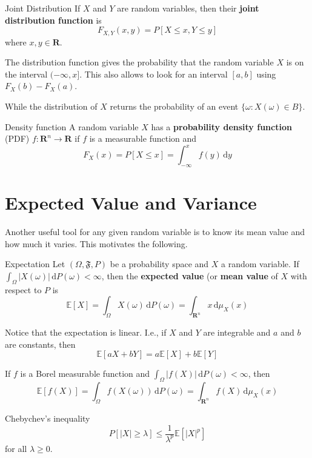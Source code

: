 \begin{definition}[]{Joint Distribution}{}
	If $X$ and $Y$ are random variables, then their \textbf{joint distribution function} is
	\[
		F_{X,Y}(x,y) = P [X \leq x, Y \leq y]
	\]
	where $x,y \in \textbf{R}$.
\end{definition}

The distribution function gives the probability that the random variable $X$ is on the interval $(-\infty, x]$. This also allows to look for an interval $[a,b]$ using $F_X(b) - F_X(a)$.

While the distribution of $X$ returns the probability of an event $\{ \omega : X(\omega) \in B\}$.

\begin{definition}[]{Density function}{}
	A random variable $X$ has a \textbf{probability density function} (PDF) $f : \textbf{R}^n \longrightarrow \textbf{R}$ if $f$ is a measurable function and \[ F_X(x) = P[X \leq x] = \int_{-\infty}^x f(y) \, \mathrm{d}y \]
\end{definition}

\section{Expected Value and Variance}

Another useful tool for any given random variable is to know its mean value and how much it varies. This motivates the following.

\begin{definition}[]{Expectation}{}
	Let $(\Omega, \mathfrak{F}, P)$ be a probability space and $X$ a random variable. If $\int_{\Omega} |X(\omega)|\, \mathrm{d}P(\omega) < \infty$, then the \textbf{expected value} (or \textbf{mean value} of $X$ with respect to $P$ is
	\[
		\mathbb{E}[X] = \int_{\Omega} X(\omega) \, \mathrm{d}P(\omega) = \int_{\textbf{R}^n} x \, \mathrm{d}\mu_X(x)
	\]
\end{definition}

Notice that the expectation is linear. I.e., if $X$ and $Y$ are integrable and $a$ and $b$ are constants, then \[ \mathbb{E} [aX+bY] = a \mathbb{E}[X] + b \mathbb{E}[Y] \]

If $f$ is a Borel measurable function and $\int_{\Omega} |f(X)| \, \mathrm{d} P(\omega) < \infty$, then
\[
	\mathbb{E}[f(X)] = \int_{\Omega} f(X(\omega)) \, \mathrm{d} P(\omega) = \int_{\textbf{R}^n} f(X) \, \mathrm{d}\mu_X(x)
\]

\begin{theorem}[]{Chebychev's inequality}{}
	\[
		P[ |X| \geq \lambda] \leq \frac{1}{\lambda^p} \mathbb{E}[|X|^p]
	\]
	for all $\lambda \geq 0$.
\end{theorem}

